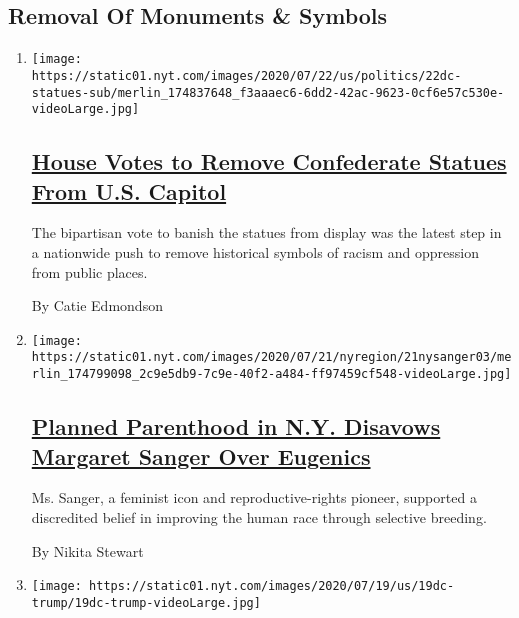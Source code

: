 \hypertarget{removal-of-monuments--symbols}{%
\subsection{Removal Of Monuments \&
Symbols}\label{removal-of-monuments--symbols}}

\begin{enumerate}
\def\labelenumi{\arabic{enumi}.}
\item
  \texttt{[image: https://static01.nyt.com/images/2020/07/22/us/politics/22dc-statues-sub/merlin\_174837648\_f3aaaec6-6dd2-42ac-9623-0cf6e57c530e-videoLarge.jpg]}

  \hypertarget{house-votes-to-remove-confederate-statues-from-us-capitol}{%
  \subsection{\texorpdfstring{\href{/2020/07/22/us/politics/confederate-statues-us-capitol.html}{House
  Votes to Remove Confederate Statues From U.S.
  Capitol}}{House Votes to Remove Confederate Statues From U.S. Capitol}}\label{house-votes-to-remove-confederate-statues-from-us-capitol}}

  The bipartisan vote to banish the statues from display was the latest
  step in a nationwide push to remove historical symbols of racism and
  oppression from public places.

  By Catie Edmondson
\item
  \texttt{[image: https://static01.nyt.com/images/2020/07/21/nyregion/21nysanger03/merlin\_174799098\_2c9e5db9-7c9e-40f2-a484-ff97459cf548-videoLarge.jpg]}

  \hypertarget{planned-parenthood-in-ny-disavows-margaret-sanger-over-eugenics}{%
  \subsection{\texorpdfstring{\href{/2020/07/21/nyregion/planned-parenthood-margaret-sanger-eugenics.html}{Planned
  Parenthood in N.Y. Disavows Margaret Sanger Over
  Eugenics}}{Planned Parenthood in N.Y. Disavows Margaret Sanger Over Eugenics}}\label{planned-parenthood-in-ny-disavows-margaret-sanger-over-eugenics}}

  Ms. Sanger, a feminist icon and reproductive-rights pioneer, supported
  a discredited belief in improving the human race through selective
  breeding.

  By Nikita Stewart
\item
  \texttt{[image: https://static01.nyt.com/images/2020/07/19/us/19dc-trump/19dc-trump-videoLarge.jpg]}


\end{enumerate}
